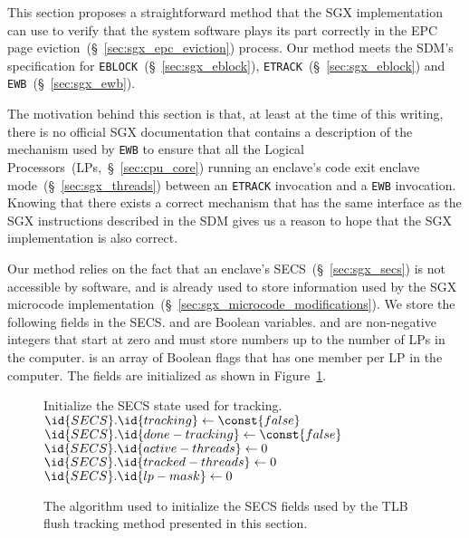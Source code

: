 \label{sec:sgx_ewb_guess}

This section proposes a straightforward method that the SGX implementation can
use to verify that the system software plays its part correctly in the EPC page
eviction~(\S~\ref{sec:sgx_epc_eviction}) process. Our method meets the SDM's
specification for \texttt{EBLOCK}~(\S~\ref{sec:sgx_eblock}),
\texttt{ETRACK}~(\S~\ref{sec:sgx_eblock}) and
\texttt{EWB}~(\S~\ref{sec:sgx_ewb}).

The motivation behind this section is that, at least at the time of this
writing, there is no official SGX documentation that contains a description of
the mechanism used by \texttt{EWB} to ensure that all the Logical
Processors~(LPs,~\S~\ref{sec:cpu_core}) running an enclave's code exit enclave
mode~(\S~\ref{sec:sgx_threads}) between an \texttt{ETRACK} invocation and a
\texttt{EWB} invocation. Knowing that there exists a correct mechanism that has
the same interface as the SGX instructions described in the SDM gives us a
reason to hope that the SGX implementation is also correct.

Our method relies on the fact that an enclave's SECS~(\S~\ref{sec:sgx_secs}) is
not accessible by software, and is already used to store information used by
the SGX microcode implementation~(\S~\ref{sec:sgx_microcode_modifications}).
We store the following fields in the SECS.  and
 are Boolean variables.  and
 are non-negative integers that start at zero and must store
numbers up to the number of LPs in the computer.  is an array of
Boolean flags that has one member per LP in the computer. The fields are
initialized as shown in Figure~\ref{fig:sgx_tracking_ecreate}.

\begin{figure}[hbt]
  \begin{codebox}
  \zi \Comment Initialize the SECS state used for tracking.
  \li $\id{SECS}.\id{tracking} \gets \const{false}$
  \li $\id{SECS}.\id{done-tracking} \gets \const{false}$
  \li $\id{SECS}.\id{active-threads} \gets 0$
  \li $\id{SECS}.\id{tracked-threads} \gets 0$
  \li $\id{SECS}.\id{lp-mask} \gets 0$
  \end{codebox}
  \caption{
    The algorithm used to initialize the SECS fields used by the TLB flush
    tracking method presented in this section.
  }
  \label{fig:sgx_tracking_ecreate}
\end{figure}

